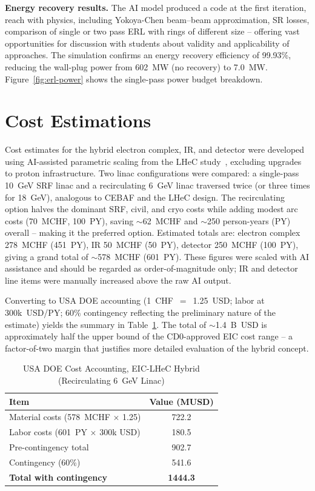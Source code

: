 \documentclass[%
               refpage       %
               hyphens,      %
               ]{jacow}
\begin{document}
  \textbf{Energy recovery results.}     
  The AI model produced a code at the first iteration, reach with physics, including Yokoya-Chen beam--beam approximation, SR losses, comparison of single or two pass ERL with rings of different size -- offering vast opportunities for discussion with students about validity and applicability of approaches.  The simulation confirms an energy recovery efficiency of 99.93\%,          
  reducing the wall-plug power from 602~MW (no recovery) to 7.0~MW. Figure~\ref{fig:erl-power} shows the single-pass power budget              
  breakdown. 
                                                                              


\section{Cost Estimations}

Cost estimates for the hybrid electron complex, IR, and detector were 
developed using AI-assisted parametric scaling from the LHeC  study~\cite{LHeC-costs}, excluding upgrades to proton infrastructure. 
Two linac configurations were compared: a single-pass 10~GeV SRF linac 
and a recirculating 6~GeV linac traversed twice (or three times for 
18~GeV), analogous to CEBAF and the LHeC design. The recirculating option 
halves the dominant SRF, civil, and cryo costs while adding modest 
arc costs (70~MCHF, 100~PY), saving $\sim$62~MCHF and $\sim$250 
person-years (PY) overall -- making it the preferred option. 
Estimated totals are: electron complex 278~MCHF (451~PY), IR 50~MCHF 
(50~PY), detector 250~MCHF (100~PY), giving a grand total of 
$\sim$578~MCHF (601~PY). These figures were scaled with AI assistance 
and should be regarded as order-of-magnitude only; IR and detector 
line items were manually increased above the raw AI output.

Converting to USA DOE accounting (1~CHF~$=$~1.25~USD; labor at 
300k~USD/PY; 60\% contingency reflecting the preliminary nature of the 
estimate) yields the summary in Table~\ref{tab:cost-doe}. The total of 
$\sim$1.4~B~USD is approximately half the upper bound of the CD0-approved 
EIC cost range -- a factor-of-two margin that justifies more detailed 
evaluation of the hybrid concept.

\begin{table}[!hbt]
\centering
\caption{USA DOE Cost Accounting, EIC-LHeC Hybrid
         (Recirculating 6~GeV Linac)}
\label{tab:cost-doe}
\begin{tabular}{lc}
\toprule
\textbf{Item} & \textbf{Value (MUSD)} \\
\midrule
Material costs (578~MCHF $\times$ 1.25)  & 722.2 \\
Labor costs (601~PY $\times$ 300k USD)   & 180.5 \\
Pre-contingency total                    & 902.7 \\
Contingency (60\%)                       & 541.6 \\
\textbf{Total with contingency}          & \textbf{1444.3} \\
\bottomrule
\end{tabular}
\end{table}
\end{document}
